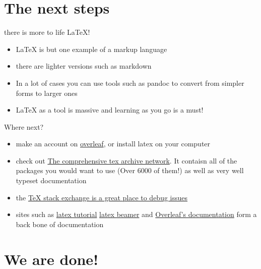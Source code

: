 \documentclass[notes]{beamer}
\begin{document}
\section{The next steps}
\begin{frame}{there is more to life \LaTeX{}!}
\begin{itemize}
  \item LaTeX is but one example of a markup language
  \item there are lighter versions such as markdown
  \item In a lot of cases you can use tools such as pandoc to convert from
  simpler forms to larger ones
  \item LaTeX as a tool is massive and learning as you go is a must!
\end{itemize}

\end{frame}

\begin{frame}{Where next?}
  \begin{itemize}
	\item make an account on \href{https://overleaf.com}{overleaf}, or install latex on your computer
	\item check out \href{https://ctan.org/}{The comprehensive tex archive
	  network}. It contaisn all of the packages you would want to use (Over 6000
	of them!) as well as very well typeset documentation
	\item the \href{https://tex.stackexchange.com/}{\TeX{} stack exchange is a
	  great place to debug issues}
	\item sites such as \href{https://latex-tutorial.com/}{latex
	  tutorial} \href{https://latex-beamer.com/}{latex beamer}
	and \href{https://www.overleaf.com/learn}{Overleaf's documentation} form a
	back bone of documentation

  \end{itemize}
\end{frame}


\section{We are done!}
\begin{frame}
	\begin{center}
	\end{center}
\end{frame}
\end{document}
